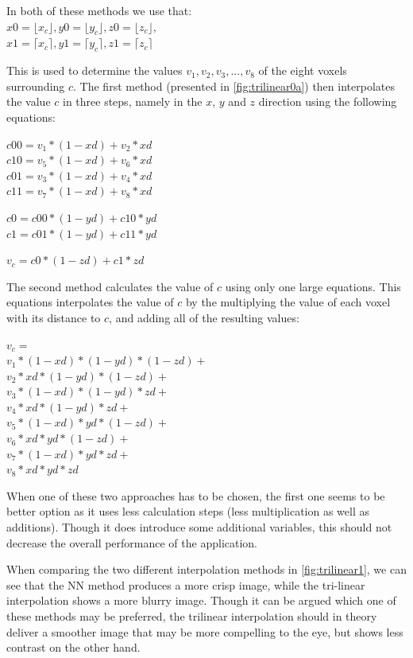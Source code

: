 In both of these methods we use that:\\
$x0 = \lfloor x_c\rfloor, y0 = \lfloor y_c\rfloor, z0 = \lfloor z_c\rfloor,$\\
$x1 = \lceil x_c\rceil, y1 = \lceil y_c\rceil, z1 = \lceil z_c\rceil$

This is used to determine the values $v_1, v_2, v_3, ..., v_8$ of the eight voxels surrounding $c$. The first method \cite{wikiTriLin} (presented in \ref{fig:trilinear0a}) then interpolates the value $c$ in three steps, namely in the $x$, $y$ and $z$ direction using the following equations:

$c00 = v_1*(1-xd) + v_2*xd$\\
$c10 = v_5*(1-xd) + v_6*xd$\\
$c01 = v_3*(1-xd) + v_4*xd$\\
$c11 = v_7*(1-xd) + v_8*xd$

$c0 = c00*(1-yd) + c10*yd$\\
$c1 = c01*(1-yd) + c11*yd$

$v_c = c0*(1-zd) + c1*zd$

The second method \cite{paulBourke} calculates the value of $c$ using only one large equations. This equations interpolates the value of $c$ by the multiplying the value of each voxel with its distance to $c$, and adding all of the resulting values:

$v_c =$\\
$v_1*(1-xd)*(1-yd)*(1-zd) +$\\
$v_2*xd*(1-yd)*(1-zd) +$\\
$v_3*(1-xd)*(1-yd)*zd +$\\
$v_4*xd*(1-yd)*zd +$\\
$v_5*(1-xd)*yd*(1-zd) +$\\
$v_6*xd*yd*(1-zd) +$\\
$v_7*(1-xd)*yd*zd +$\\
$v_8*xd*yd*zd$

When one of these two approaches has to be chosen, the first one seems to be better option as it uses less calculation steps (less multiplication as well as additions). Though it does introduce some additional variables, this should not decrease the overall performance of the application.

When comparing the two different interpolation methods in \ref{fig:trilinear1}, we can see that the NN method produces a more crisp image, while the tri-linear interpolation shows a more blurry image. Though it can be argued which one of these methods may be preferred, the trilinear interpolation should in theory deliver a smoother image that may be more compelling to the eye, but shows less contrast on the other hand.

